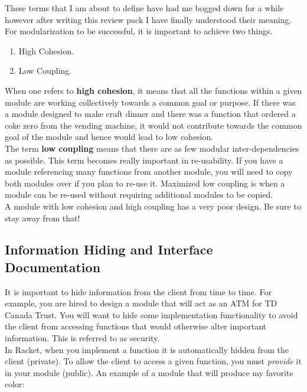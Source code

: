 \documentclass[12pt,extarticle]{article}
\begin{document}
These terms that I am about to define have had me bogged down for a while however after writing this review pack I have finally understood their meaning. For modularization to be successful, it is important to achieve two things.

\begin{enumerate}

\item High Cohesion.
\item Low Coupling.

\end{enumerate}

When one refers to \textbf{high cohesion}, it means that all the functions within a given module are working collectively towards a common goal or purpose. If there was a module designed to make craft dinner and there was a function that ordered a coke zero from the vending machine, it would not contribute towards the common goal of the module and hence would lead to low cohesion.\\

The term \textbf{low coupling} means that there are as few modular inter-dependencies as possible. This term becomes really important in re-usability. If you have a module referencing many functions from another module, you will need to copy both modules over if you plan to re-use it. Maximized low coupling is when a module can be re-used without requiring additional modules to be copied.\\

A module with low cohesion and high coupling has a very poor design. Be sure to stay away from that!

\subsection{Information Hiding and Interface Documentation}

It is important to hide information from the client from time to time. For example, you are hired to design a module that will act as an ATM for TD Canada Trust. You will want to hide some implementation functionality to avoid the client from accessing functions that would otherwise alter important information. This is referred to as security.\\

In Racket, when you implement a function it is automatically hidden from the client (private). To allow the client to access a given function, you must \emph{provide} it in your module (public). An example of a module that will produce my favorite color:\\
\end{document}
